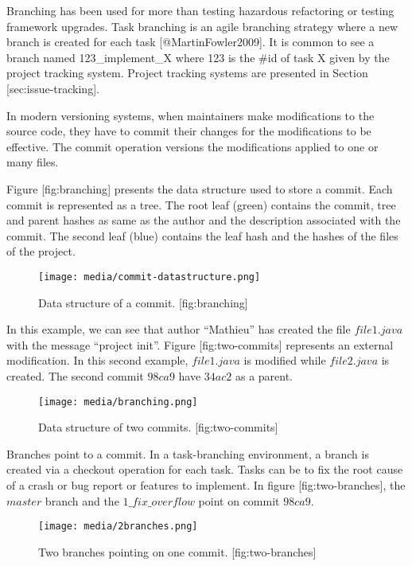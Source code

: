 Branching has been used for more than testing hazardous refactoring or
testing framework upgrades. Task branching is an agile branching
strategy where a new branch is created for each task
{[}@MartinFowler2009{]}. It is common to see a branch named
{123\_implement\_X} where {123} is the {\#id} of task {X} given by the
project tracking system. Project tracking systems are presented in
Section {[}sec:issue-tracking{]}.

In modern versioning systems, when maintainers make modifications to the
source code, they have to commit their changes for the modifications to
be effective. The commit operation versions the modifications applied to
one or many files.

Figure {[}fig:branching{]} presents the data structure used to store a
commit. Each commit is represented as a tree. The root leaf (green)
contains the commit, tree and parent hashes as same as the author and
the description associated with the commit. The second leaf (blue)
contains the leaf hash and the hashes of the files of the project.

\begin{figure}[htbp]
\centering
\texttt{[image: media/commit-datastructure.png]}
\caption{Data structure of a commit. {[}fig:branching{]}}
\end{figure}

In this example, we can see that author ``Mathieu'' has created the file
\(file1.java\) with the message ``project init''. Figure
{[}fig:two-commits{]} represents an external modification. In this
second example, \(file1. java\) is modified while \(file2.java\) is
created. The second commit \(98ca9\) have \(34ac2\) as a parent.

\begin{figure}[htbp]
\centering
\texttt{[image: media/branching.png]}
\caption{Data structure of two commits. {[}fig:two-commits{]}}
\end{figure}

Branches point to a commit. In a task-branching environment, a branch is
created via a checkout operation for each task. Tasks can be to fix the
root cause of a crash or bug report or features to implement. In figure
{[}fig:two-branches{]}, the \(master\) branch and the
\(1\_fix\_overflow\) point on commit \(98ca9\).

\begin{figure}[htbp]
\centering
\texttt{[image: media/2branches.png]}
\caption{Two branches pointing on one commit. {[}fig:two-branches{]}}
\end{figure}

